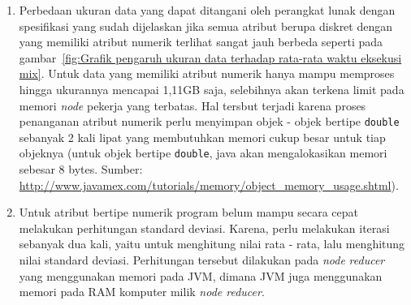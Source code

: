 \begin{enumerate}[label=(\alph*)]
	\item Perbedaan ukuran data yang dapat ditangani oleh perangkat lunak dengan spesifikasi yang sudah dijelaskan jika semua atribut berupa diskret dengan yang memiliki atribut numerik terlihat sangat jauh berbeda seperti pada gambar~\ref{fig:Grafik pengaruh ukuran data terhadap rata-rata waktu eksekusi mix}. Untuk data yang memiliki atribut numerik hanya mampu memproses hingga ukurannya mencapai 1,11GB saja, selebihnya akan terkena limit pada memori \textit{node} pekerja yang terbatas. Hal tersbut terjadi karena proses penanganan atribut numerik perlu menyimpan objek - objek bertipe \texttt{double} sebanyak 2 kali lipat yang membutuhkan memori cukup besar untuk tiap objeknya (untuk objek bertipe \texttt{double}, java akan mengalokasikan memori sebesar 8 bytes. Sumber: \url{http://www.javamex.com/tutorials/memory/object_memory_usage.shtml}).
	\item Untuk atribut bertipe numerik program belum mampu secara cepat melakukan perhitungan standard deviasi. Karena, perlu melakukan iterasi sebanyak dua kali, yaitu untuk menghitung nilai rata - rata, lalu menghitung nilai standard deviasi. Perhitungan tersebut dilakukan pada \textit{node} \textit{reducer} yang menggunakan memori pada JVM, dimana JVM juga menggunakan memori pada RAM komputer milik \textit{node reducer}.
	
	
\end{enumerate}